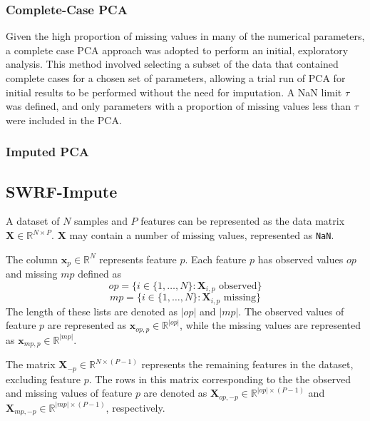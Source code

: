 \documentclass[preprint,longauthor,twocolumn]{aastex631}
\begin{document}
\subsubsection{Complete-Case PCA}
Given the high proportion of missing values in many of the numerical parameters, a complete case PCA approach was adopted to perform an initial, exploratory analysis. This method involved selecting a subset of the data that contained complete cases for a chosen set of parameters, allowing a trial run of PCA for initial results to be performed without the need for imputation. A NaN limit $\tau$ was defined, and only parameters with a proportion of missing values less than $\tau$ were included in the PCA.

\subsubsection{Imputed PCA}

\subsection{SWRF-Impute}

A dataset of $N$ samples and $P$ features can be represented as the data matrix $\mathbf{X} \in \mathbb{R}^{N \times P}$. $\mathbf{X}$ may contain a number of missing values, represented as \verb|NaN|.

The column $\mathbf{x}_p \in \mathbb{R}^N$ represents feature $p$. Each feature $p$ has observed values $op$ and missing $mp$ defined as
\begin{equation}
  op = \{i \in \{1,\dots,N\} : \mathbf{X}_{i,p} \text{ observed} \}
\end{equation}
\begin{equation}
  mp = \{i \in \{1,\dots,N\} : \mathbf{X}_{i,p} \text{ missing} \}
\end{equation}
The length of these lists are denoted as $|op|$ and $|mp|$. The observed values of feature $p$ are represented as $\mathbf{x}_{op,p} \in \mathbb{R}^{|op|}$, while the missing values are represented as $\mathbf{x}_{mp,p} \in \mathbb{R}^{|mp|}$.

The matrix $\mathbf{X}_{-p} \in \mathbb{R}^{N\times(P-1)}$ represents the remaining features in the dataset, excluding feature $p$. The rows in this matrix corresponding to the the observed and missing values of feature $p$ are denoted as $\mathbf{X}_{op,-p} \in \mathbb{R}^{|op|\times (P-1)}$ and $\mathbf{X}_{mp,-p} \in \mathbb{R}^{|mp| \times (P-1)}$, respectively.
\end{document}
